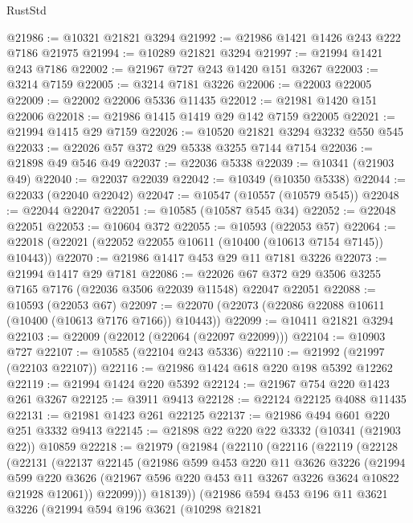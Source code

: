 \begin{lexlean}{RustStd}
\begin{coremodule}
{\begin{coremodule}
{{{{{{{{{{{{{{{{{{{{{{{{{@21986 := @10321 @21821 @3294
@21992 := @21986 @1421 @1426 @243 @222 @7186 @21975
@21994 := @10289 @21821 @3294
@21997 := @21994 @1421 @243 @7186
@22002 := @21967 @727 @243 @1420 @151 @3267
@22003 := @3214 @7159
@22005 := @3214 @7181 @3226
@22006 := @22003 @22005
@22009 := @22002 @22006 @5336 @11435
@22012 := @21981 @1420 @151 @22006
@22018 := @21986 @1415 @1419 @29 @142 @7159 @22005
@22021 := @21994 @1415 @29 @7159
@22026 := @10520 @21821 @3294 @3232 @550 @545
@22033 := @22026 @57 @372 @29 @5338 @3255 @7144 @7154
@22036 := @21898 @49 @546 @49
@22037 := @22036 @5338
@22039 := @10341 (@21903 @49)
@22040 := @22037 @22039
@22042 := @10349 (@10350 @5338)
@22044 := @22033 (@22040 @22042)
@22047 := @10547 (@10557 (@10579 @545))
@22048 := @22044 @22047
@22051 := @10585 (@10587 @545 @34)
@22052 := @22048 @22051
@22053 := @10604 @372
@22055 := @10593 (@22053 @57)
@22064 := @22018 (@22021 (@22052 @22055 @10611 (@10400 (@10613 @7154 @7145)) @10443))
@22070 := @21986 @1417 @453 @29 @11 @7181 @3226
@22073 := @21994 @1417 @29 @7181
@22086 := @22026 @67 @372 @29 @3506 @3255 @7165 @7176 (@22036 @3506 @22039 @11548) @22047 @22051
@22088 := @10593 (@22053 @67)
@22097 := @22070 (@22073 (@22086 @22088 @10611 (@10400 (@10613 @7176 @7166)) @10443))
@22099 := @10411 @21821 @3294
@22103 := @22009 (@22012 (@22064 (@22097 @22099)))
@22104 := @10903 @727
@22107 := @10585 (@22104 @243 @5336)
@22110 := @21992 (@21997 (@22103 @22107))
@22116 := @21986 @1424 @618 @220 @198 @5392 @12262
@22119 := @21994 @1424 @220 @5392
@22124 := @21967 @754 @220 @1423 @261 @3267
@22125 := @3911 @9413
@22128 := @22124 @22125 @4088 @11435
@22131 := @21981 @1423 @261 @22125
@22137 := @21986 @494 @601 @220 @251 @3332 @9413
@22145 := @21898 @22 @220 @22 @3332 (@10341 (@21903 @22)) @10859
@22218 := @21979
    (@21984
      (@22110
        (@22116
          (@22119
            (@22128
              (@22131
                (@22137
                  @22145
                  (@21986
                    @599
                    @453
                    @220
                    @11
                    @3626
                    @3226
                    (@21994
                      @599
                      @220
                      @3626
                      (@21967 @596 @220 @453 @11 @3267 @3226 @3624 @10822 @21928 @12061))
                    @22099)))
              @18139))
          (@21986
            @594
            @453
            @196
            @11
            @3621
            @3226
            (@21994
              @594
              @196
              @3621
              (@10298
                @21821
}}}}}}}}}}}}}}}}}}}}}}}}}
\end{coremodule}}
\end{coremodule}
\end{lexlean}
